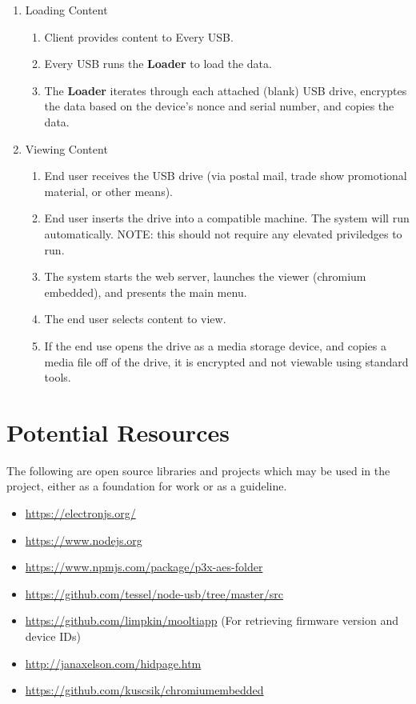 \documentclass{article}
\begin{document}
\begin{enumerate}
\item Loading Content
    \begin{enumerate}
    \item Client provides content to Every USB.
    \item Every USB runs the {\bf Loader} to load the data.
    \item The {\bf Loader} iterates through each attached (blank) USB drive,
          encryptes the data based on the device's nonce and serial number,
          and copies the data.
    \end{enumerate}

\item Viewing Content
    \begin{enumerate}
    \item End user receives the USB drive (via postal mail, trade show 
          promotional material, or other means).
    \item End user inserts the drive into a compatible machine.  The 
          system will run automatically.  NOTE: this should not require
          any elevated priviledges to run.
    \item The system starts the web server, launches the viewer (chromium
          embedded), and presents the main menu.
    \item The end user selects content to view.
    \item If the end use opens the drive as a media storage device, and 
          copies a media file off of the drive, it is encrypted and not
          viewable using standard tools.
    \end{enumerate}

\end{enumerate}

\section{Potential Resources}
The following are open source libraries and projects which may be used in the
project, either as a foundation for work or as a guideline.
\begin{itemize}
\item \url{https://electronjs.org/}
\item \url{https://www.nodejs.org}
\item \url{https://www.npmjs.com/package/p3x-aes-folder}
\item \url{https://github.com/tessel/node-usb/tree/master/src}
\item \url{https://github.com/limpkin/mooltiapp} (For retrieving 
      firmware version and device IDs)
\item \url{http://janaxelson.com/hidpage.htm}
\item \url{https://github.com/kuscsik/chromiumembedded}
\end{itemize}
\end{document}
